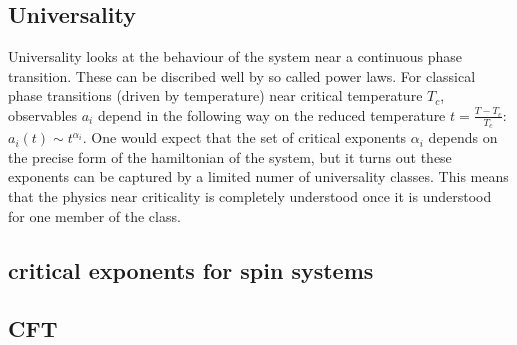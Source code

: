 \subsection{Universality }

Universality looks at the behaviour of the system near a continuous phase transition. These can be discribed well by so called power laws. For classical phase transitions (driven by temperature) near critical temperature $T_c$, observables $a_i$ depend in the following way on the reduced temperature $t=\frac{T-T_c}{T_c}$: $ a_i(t) \sim t^{\alpha_i}$. One would expect that the set of critical exponents ${\alpha_i}$ depends on the precise form of the hamiltonian of the system, but it turns out these exponents can be captured by a limited numer of universality classes. This means that the physics near criticality is completely understood once it is understood for one member of the class.

\subsection{critical exponents for spin systems}




\subsection{CFT}




